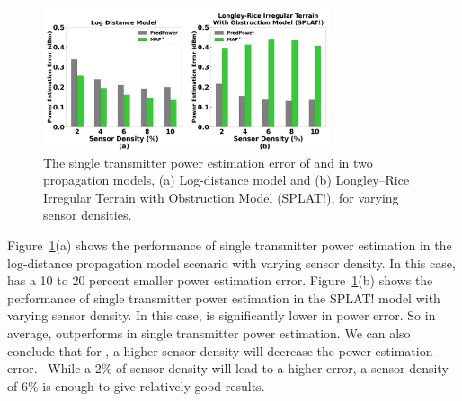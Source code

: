 \begin{figure}
    \centering
    \includegraphics[width=0.75\textwidth]{chapters/wowmom-pmc/figures/powererror_varysensor.png}
    \caption{The single transmitter power estimation error of \power and \map in two propagation models, (a) Log-distance model and (b) Longley--Rice Irregular Terrain with Obstruction Model (SPLAT!), for varying sensor densities.}
    \label{fig:singleTXpower}
\end{figure}

Figure~\ref{fig:singleTXpower}(a) shows the performance of single transmitter power estimation in the log-distance propagation model scenario with varying sensor density.
In this case, \map has a 10 to 20 percent smaller power estimation error.
Figure~\ref{fig:singleTXpower}(b) shows the performance of single transmitter power estimation in the SPLAT! model with varying sensor density.
In this case, \power is significantly lower in power error.
So in average, \power outperforms \map in single transmitter power estimation.
We can also conclude that for \power, a higher sensor density will decrease the power estimation error. \
While a 2\% of sensor density will lead to a higher error, a sensor density of 6\% is enough to give relatively good results.

